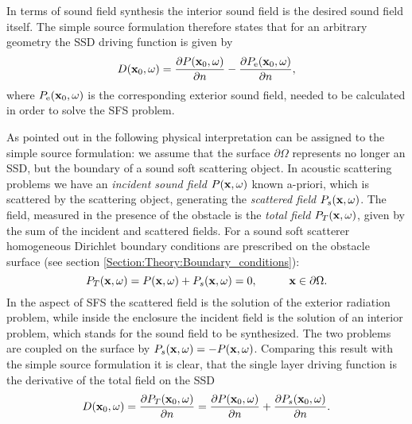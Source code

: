 In terms of sound field synthesis the interior sound field is the desired sound field itself. The simple source formulation therefore states that for an arbitrary geometry the SSD driving function is given by
\begin{equation}
D(\mathbf{x}_0,\omega) = 
\frac{\partial P(\mathbf{x}_0,\omega)}{\partial n} - \frac{\partial P_{\mathrm{e}}(\mathbf{x}_0,\omega)}{\partial n},
\label{Eq:Theory:Source_strength}
\end{equation}
where $P_{\mathrm{e}}(\mathbf{x}_0,\omega)$ is the corresponding exterior sound field, needed to be calculated in order to solve the SFS problem.

\vspace{3mm}
As pointed out in \cite{Fazi2013:Equivalent_scattering, Fazi2010, Schultz2014:Comparing_approaches, Zotter2013:uniqueness} the following physical interpretation can be assigned to the simple source formulation: we assume that the surface $\partial \Omega$ represents no longer an SSD, but the boundary of a sound soft scattering object. In acoustic scattering problems we have an \emph{incident sound field} $P(\mathbf{x},\omega)$ known a-priori, which is scattered by the scattering object, generating the \emph{scattered field} $P_s(\mathbf{x},\omega)$. The field, measured in the presence of the obstacle is the \emph{total field} $P_T(\mathbf{x},\omega)$, given by the sum of the incident and scattered fields. For a sound soft scatterer homogeneous Dirichlet boundary conditions are prescribed on the obstacle surface (see section \ref{Section:Theory:Boundary_conditions}):
\begin{equation}
P_T(\mathbf{x},\omega) = P(\mathbf{x},\omega) + P_s(\mathbf{x},\omega) = 0, \hspace{1cm} \mathbf{x} \in \partial \Omega.
\end{equation}
In the aspect of SFS the scattered field is the solution of the exterior radiation problem, while inside the enclosure the incident field is the solution of an interior problem, which stands for the sound field to be synthesized. The two problems are coupled on the surface by $P_s(\mathbf{x},\omega) = -P(\mathbf{x},\omega)$.
Comparing this result with the simple source formulation it is clear, that the single layer driving function is the derivative of the total field on the SSD
\begin{equation}
D(\mathbf{x}_0,\omega) = \frac{\partial P_T(\mathbf{x}_0,\omega)}{\partial n}
=
\frac{\partial P(\mathbf{x}_0,\omega)}{\partial n} + \frac{\partial P_s(\mathbf{x}_0,\omega)}{\partial n}.
\label{Eq:Theory:Equivalent_scattering_driv_fun}
\end{equation}

